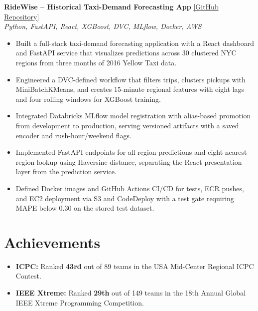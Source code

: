 \documentclass[10pt, letterpaper]{article}
\begin{document}
\textbf{RideWise -- Historical Taxi-Demand Forecasting App} \hfill \href{https://github.com/Jaswanth19-596/RideWise}{[GitHub Repository]} \\
\textit{Python, FastAPI, React, XGBoost, DVC, MLflow, Docker, AWS}
\begin{itemize}
    \item Built a full-stack taxi-demand forecasting application with a React dashboard and FastAPI service that visualizes predictions across 30 clustered NYC regions from three months of 2016 Yellow Taxi data.
    \item Engineered a DVC-defined workflow that filters trips, clusters pickups with MiniBatchKMeans, and creates 15-minute regional features with eight lags and four rolling windows for XGBoost training.
    \item Integrated Databricks MLflow model registration with alias-based promotion from development to production, serving versioned artifacts with a saved encoder and rush-hour/weekend flags.
    \item Implemented FastAPI endpoints for all-region predictions and eight nearest-region lookup using Haversine distance, separating the React presentation layer from the prediction service.
    \item Defined Docker images and GitHub Actions CI/CD for tests, ECR pushes, and EC2 deployment via S3 and CodeDeploy with a test gate requiring MAPE below 0.30 on the stored test dataset.
\end{itemize}

\section{Achievements}
\begin{itemize}
    \item \textbf{ICPC:} Ranked \textbf{43rd} out of 89 teams in the USA Mid-Center Regional ICPC Contest.
    \item \textbf{IEEE Xtreme:} Ranked \textbf{29th} out of 149 teams in the 18th Annual Global IEEE Xtreme Programming Competition.
\end{itemize}
\end{document}
